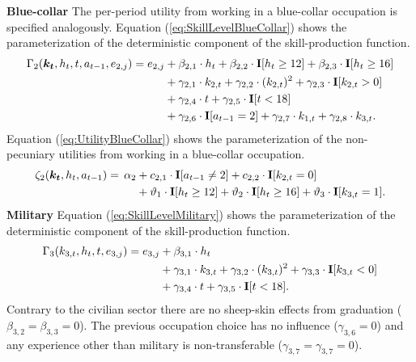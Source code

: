 \noindent\textbf{Blue-collar} The per-period utility from working in a blue-collar occupation is specified analogously. Equation (\ref{eq:SkillLevelBlueCollar}) shows the parameterization of the deterministic component of the skill-production function.
%
\begin{align}\label{eq:SkillLevelBlueCollar}
    \Gamma_2(\bm{k_t}, h_t, t, a_{t-1}, e_{2,j}) = e_{2,j} & + \beta_{2,1} \cdot h_t + \beta_{2, 2} \cdot {\textbf{I}}[h_t \geq 12] + \beta_{2,3} \cdot {\textbf{I}}[h_t\geq 16] \\\nonumber
    							 & + \gamma_{2, 1} \cdot  k_{2,t} + \gamma_{2,2} \cdot  (k_{2,t})^2 + \gamma_{2,3} \cdot  {\textbf{I}}[k_{2,t} > 0] \\\nonumber
                                   & + \gamma_{2,4} \cdot  t + \gamma_{2,5} \cdot {\textbf{I}}[t < 18] \\\nonumber
                                  & + \gamma_{2,6} \cdot  {\textbf{I}}[a_{t-1} = 2]  + \gamma_{2,7} \cdot  k_{1,t} + \gamma_{2,8} \cdot  k_{3,t}.
\end{align}
%
\noindent Equation (\ref{eq:UtilityBlueCollar}) shows the parameterization of the non-pecuniary utilities from working in a blue-collar occupation.
%
\begin{align}\label{eq:UtilityBlueCollar}
\zeta_{2}( \bm{k_t}, h_t, a_{t-1} ) = \,\alpha_2 & + c_{2,1} \cdot {\textbf{I}}[a_{t-1} \neq 2] + c_{2,2} \cdot {\textbf{I}}[k_{2,t} = 0]\\\nonumber
                            & + \vartheta_1 \cdot {\textbf{I}}[h_t \geq 12] + \vartheta_2 \cdot {\textbf{I}}[h_t \geq 16] + \vartheta_3 \cdot {\textbf{I}}[k_{3,t} = 1].
\end{align}
%
\noindent\textbf{Military} Equation (\ref{eq:SkillLevelMilitary}) shows the parameterization of the deterministic component of the skill-production function.
%
\begin{align}\label{eq:SkillLevelMilitary}
    \Gamma_3( k_{3,t}, h_t, t, e_{3,j}) = e_{3,j} & + \beta_{3,1} \cdot h_t \\\nonumber
	               \nonumber &+ \gamma_{3,1} \cdot  k_{3,t} + \gamma_{3,2} \cdot (k_{3,t})^2 + \gamma_{3,3} \cdot {\textbf{I}}[k_{3,t} < 0]\\\nonumber
									 & + \gamma_{3,4} \cdot t + \gamma_{3,5} \cdot {\textbf{I}}[t < 18].
\end{align}
%
Contrary to the civilian sector there are no sheep-skin effects from graduation ($\beta_{3,2} = \beta_{3,3}= 0$). The previous occupation choice has no influence ($\gamma_{3,6}= 0$) and any experience other than military is non-transferable ($\gamma_{3,7} = \gamma_{3,7} = 0$).\\

